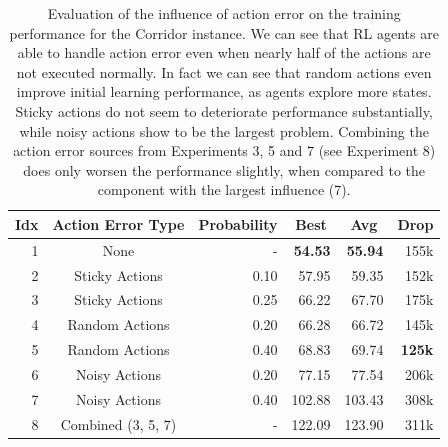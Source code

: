 \begin{table}[htp]
    \begin{center}
        \begin{tabular}{rcrrrr}
            \toprule
            \multicolumn{1}{c}{Idx} & \multicolumn{1}{c}{Action Error Type} & \multicolumn{1}{c}{Probability} & \multicolumn{1}{c}{Best} & \multicolumn{1}{c}{Avg} & \multicolumn{1}{c}{Drop}\\
            \midrule
            1 & None & - & \textbf{54.53} & \textbf{55.94} & 155k \\
            \midrule
            2 & Sticky Actions & 0.10 & 57.95 & 59.35 & 152k \\
            3 & Sticky Actions & 0.25 & 66.22 & 67.70 & 175k \\
            4 & Random Actions & 0.20 & 66.28 & 66.72 & 145k \\
            5 & Random Actions & 0.40 & 68.83 & 69.74 & \textbf{125k} \\
            6 & Noisy Actions & 0.20 & 77.15 & 77.54 & 206k \\
            7 & Noisy Actions & 0.40 & 102.88 & 103.43 & 308k \\
            \midrule
            8 & Combined (3, 5, 7) & - & 122.09 & 123.90 & 311k \\
            \bottomrule
        \end{tabular}
    \end{center}
    \caption[Evaluation of the Influence of Action Error]{Evaluation of the influence of action error on the training performance for the Corridor instance. We can see that RL agents are able to handle action error even when nearly half of the actions are not executed normally. In fact we can see that random actions even improve initial learning performance, as agents explore more states. Sticky actions do not seem to deteriorate performance substantially, while noisy actions show to be the largest problem. Combining the action error sources from Experiments 3, 5 and 7 (see Experiment 8) does only worsen the performance slightly, when compared to the component with the largest influence (7).} \label{tab:Eval/Error/Actions}
\end{table}


